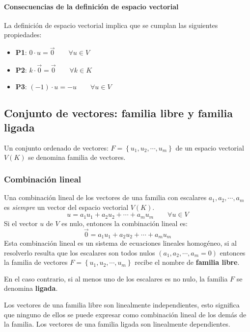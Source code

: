 \paragraph{Consecuencias de la definición de espacio vectorial}

La definición de espacio vectorial implica que se cumplan las siguientes propiedades:
\begin{itemize}
  \item \textbf{P1}: \(0\cdot u = \vec{0} \qquad \forall u \in V\)
  \item \textbf{P2}: \(k \cdot \vec{0} = \vec{0} \qquad \forall k \in K\)
  \item \textbf{P3}: \((-1) \cdot u = -u \qquad \forall u \in V\)
\end{itemize}

\subsection{Conjunto de vectores: familia libre y familia ligada}

Un conjunto ordenado de vectores: \(F = \left\{u_1,u_2,\cdots,u_m\right\}\) de un espacio vectorial \(V(K)\) se denomina familia de vectores.

\subsubsection{Combinación lineal}

Una combinación lineal de los vectores de una familia con escalares \(a_1, a_2, \cdots, a_m\) es \textit{siempre} un vector del espacio vectorial \(V(K)\).
\[
  u = a_1 u_1 + a_2 u_2 + \cdots + a_m u_m \qquad \forall u \in V
\]
Si el vector \(u\) de \(V\) es nulo, entonces la combinación lineal es:
\[
  \vec{0} = a_1 u_1 + a_2 u_2 + \cdots + a_m u_m
\]
Esta combinación lineal es un sistema de ecuaciones lineales homogéneo, si al resolverlo resulta que los escalares son todos nulos \((a_1,a_2,\cdots,a_m = 0)\) entonces la familia de vectores \(F=\left\{u_1, u_2, \cdots, u_m \right\}\) recibe el nombre de \textbf{familia libre}.

En el caso contrario, si al menos uno de los escalares es no nulo, la familia \(F\) se denomina \textbf{ligada}.

Los vectores de una familia libre son linealmente independientes, esto significa que ninguno de ellos se puede expresar como combinación lineal de los demás de la familia. Los vectores de una familia ligada son linealmente dependientes.

